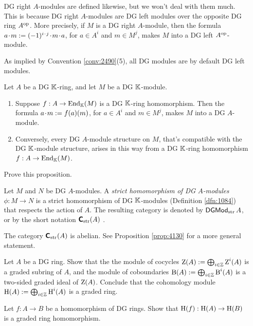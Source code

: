 DG right $A$-modules are defined likewise, but we won't deal with them 
much. This is because DG right $A$-modules are DG left modules over the 
opposite DG ring $A^{\mathrm{op}}$. More precisely, if $M$ is a DG right 
$A$-module, then the formula 
$a \mspace{1.5mu}{\cdot}\mspace{1.5mu} m := (-1)^{i \mspace{1.5mu}{\cdot}\mspace{1.5mu} j} \mspace{1.5mu}{\cdot}\mspace{1.5mu} m \mspace{1.5mu}{\cdot}\mspace{1.5mu} a$,
for $a \in A^i$ and $m \in M^j$, makes $M$ into a DG left 
$A^{\mathrm{op}}$-module.

As implied by Convention \ref{conv:2490}(5), all DG modules are by default 
DG left modules. 
 
\begin{prop} \label{prop:1130}
Let $A$ be a DG $\mathbb{K}$-ring, and let $M$ be a DG $\mathbb{K}$-module. 
\begin{enumerate}
\item Suppose $f : A \to \operatorname{End}_{\mathbb{K}}(M)$ is a DG $\mathbb{K}$-ring homomorphism. 
Then the formula $a \mspace{1.5mu}{\cdot}\mspace{1.5mu} m := f(a)(m)$, for $a \in A^i$ and $m \in M^j$,
makes $M$ into a DG $A$-module. 

\item Conversely, every DG $A$-module structure on $M$, that's compatible with 
the DG $\mathbb{K}$-module structure, arises in this way from a 
DG $\mathbb{K}$-ring homomorphism $f : A \to \operatorname{End}_{\mathbb{K}}(M)$.
\end{enumerate}
\end{prop}

\begin{exer} \label{exer:2520}
Prove this proposition. 
\end{exer}

\begin{dfn} \label{dfn:1285}
Let $M$ and $N$ be DG $A$-modules. A
{\em strict homomorphism of DG $A$-modules}
 $\phi : M \to N$ 
is a strict homomorphism of DG $\mathbb{K}$-modules (Definition \ref{dfn:1084})
that respects the action of $A$. The resulting category is denoted by 
$\operatorname{\mathsf{DGMod}}_{\mathrm{str}} A$, or by the short notation 
$\boldsymbol{\mathsf{C}}_{\mathrm{str}}(A)$%
.
\end{dfn}

The category $\boldsymbol{\mathsf{C}}_{\mathrm{str}}(A)$ is abelian. See Proposition 
\ref{prop:4130} for a more general statement. 

\begin{exer} \label{exer:1100}
Let $A$ be a DG ring. Show that the the module of cocycles 
$\operatorname{Z}(A) := \bigoplus_{i \in \mathbb{Z}} \operatorname{Z}^i(A)$
is a graded subring of $A$, and the module of coboundaries
$\operatorname{B}(A) := \bigoplus_{i \in \mathbb{Z}} \operatorname{B}^i(A)$
is a two-sided graded ideal of $\operatorname{Z}(A)$. Conclude that the cohomology module
$\operatorname{H}(A) := \bigoplus_{i \in \mathbb{Z}} \operatorname{H}^i(A)$
is a graded ring. 

Let $f : A \to B$ be a homomorphism of DG rings. Show that 
$\operatorname{H}(f) : \operatorname{H}(A) \to \operatorname{H}(B)$
is a graded ring homomorphism. 
\end{exer}

